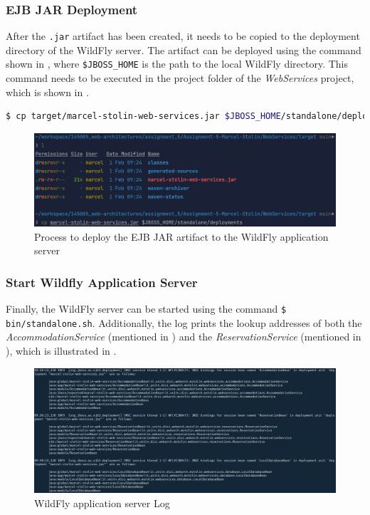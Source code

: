 \subsubsection{EJB JAR Deployment}\label{sec:03_depl_wildfly_deploy}
After the \texttt{.jar} artifact has been created, it needs to be copied to the deployment directory of the WildFly server. The artifact can be deployed using the command shown in , where \texttt{\$JBOSS\_HOME} is the path to the local WildFly directory. This command needs to be executed in the project folder of the \textit{WebServices} project, which is shown in .
\begin{lstlisting}[label=lst:03_depl_wildfly_deploy_command, caption=Command to copy the EJB JAR artifact to the WildFly deployment directory, language=bash]
$ cp target/marcel-stolin-web-services.jar $JBOSS_HOME/standalone/deployments
\end{lstlisting}
\begin{figure}[h]
\centering
\includegraphics[scale=0.2]{images/03_depl/web-services-deployment}
\caption{Process to deploy the EJB JAR artifact to the WildFly application server}
\label{fig:03_depl_wildfly_deploy_command}
\end{figure}


\subsubsection{Start Wildfly Application Server}\label{sec:03_depl_wildfly_start}
Finally, the WildFly server can be started using the command \texttt{\$ bin/standalone.sh}. Additionally, the log prints the lookup addresses of both the \textit{AccommodationService} (mentioned in ) and the \textit{ReservationService} (mentioned in ), which is illustrated in .
\begin{figure}[h]
\centering
\includegraphics[scale=0.13]{images/03_depl/deployed-beans}
\caption{WildFly application server Log}
\label{fig:03_depl_wildfly_start_addresses}
\end{figure}


